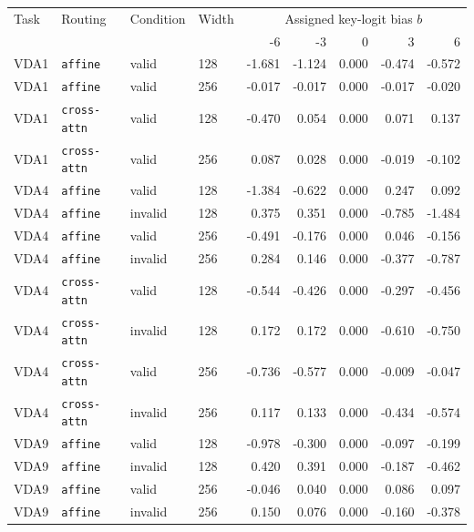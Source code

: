 \begingroup\scriptsize\setlength{\tabcolsep}{4.0pt}
\label{tab:clamp-constituents}
\begin{center}
\begin{tabular}{@{}llll*{5}{r}@{}}
\toprule
Task & Routing & Condition & Width & \multicolumn{5}{c}{Assigned key-logit bias $b$} \\
\cmidrule(lr){5-9}
 & & & & -6 & -3 & 0 & 3 & 6 \\ 
\midrule
VDA1 & \texttt{affine} & valid & 128 & -1.681 & -1.124 & 0.000 & -0.474 & -0.572 \\
VDA1 & \texttt{affine} & valid & 256 & -0.017 & -0.017 & 0.000 & -0.017 & -0.020 \\
VDA1 & \texttt{cross-attn} & valid & 128 & -0.470 & 0.054 & 0.000 & 0.071 & 0.137 \\
VDA1 & \texttt{cross-attn} & valid & 256 & 0.087 & 0.028 & 0.000 & -0.019 & -0.102 \\
VDA4 & \texttt{affine} & valid & 128 & -1.384 & -0.622 & 0.000 & 0.247 & 0.092 \\
VDA4 & \texttt{affine} & invalid & 128 & 0.375 & 0.351 & 0.000 & -0.785 & -1.484 \\
VDA4 & \texttt{affine} & valid & 256 & -0.491 & -0.176 & 0.000 & 0.046 & -0.156 \\
VDA4 & \texttt{affine} & invalid & 256 & 0.284 & 0.146 & 0.000 & -0.377 & -0.787 \\
VDA4 & \texttt{cross-attn} & valid & 128 & -0.544 & -0.426 & 0.000 & -0.297 & -0.456 \\
VDA4 & \texttt{cross-attn} & invalid & 128 & 0.172 & 0.172 & 0.000 & -0.610 & -0.750 \\
VDA4 & \texttt{cross-attn} & valid & 256 & -0.736 & -0.577 & 0.000 & -0.009 & -0.047 \\
VDA4 & \texttt{cross-attn} & invalid & 256 & 0.117 & 0.133 & 0.000 & -0.434 & -0.574 \\
VDA9 & \texttt{affine} & valid & 128 & -0.978 & -0.300 & 0.000 & -0.097 & -0.199 \\
VDA9 & \texttt{affine} & invalid & 128 & 0.420 & 0.391 & 0.000 & -0.187 & -0.462 \\
VDA9 & \texttt{affine} & valid & 256 & -0.046 & 0.040 & 0.000 & 0.086 & 0.097 \\
VDA9 & \texttt{affine} & invalid & 256 & 0.150 & 0.076 & 0.000 & -0.160 & -0.378 \\
\bottomrule
\end{tabular}
\end{center}
\endgroup
